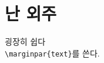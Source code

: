 	\newpage
	\section{난 외주}
	
		굉장히 쉽다\\
		\verb|\marginpar{text}|를 쓴다.\\
	





























































